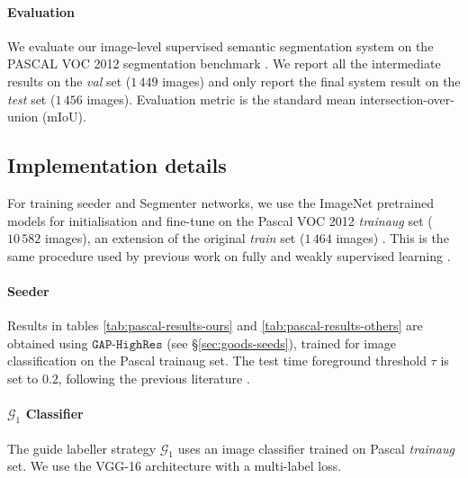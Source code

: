 \documentclass[british,10pt,twocolumn,letterpaper]{article}
\begin{document}
\paragraph{\label{subsec:Experimental-setup}Evaluation}

We evaluate our image-level supervised semantic segmentation system
on the PASCAL VOC 2012 segmentation benchmark \cite{pascal-voc-2012}.
We report all the intermediate results on the \textit{val}\emph{ }set
($1\,449$ images) and only report the final system result on the
\textit{test} set ($1\,456$ images). Evaluation metric is the standard mean
intersection-over-union (mIoU).


\subsection{\label{subsec:Implementation-details}Implementation details}

\noindent
For training seeder and Segmenter networks, we use the
ImageNet \cite{imagenet_cvpr09} pretrained models for initialisation
and fine-tune on the Pascal VOC 2012 \emph{trainaug} set ($10\,582$
images), an extension of the original \textit{train} set ($1\,464$ images)
\cite{pascal-voc-2012,Hariharan2011Iccv}. This is the same procedure
used by previous work on fully \cite{Chen2016ArxivDeeplabv2} and
weakly supervised learning \cite{kolesnikov2016seed}.

\paragraph{Seeder}

Results in tables \ref{tab:pascal-results-ours} and \ref{tab:pascal-results-others}
are obtained using $\mathtt{GAP}\text{-}\mathtt{HighRes}$ (see \S\ref{sec:goods-seeds}),
trained for image classification on the Pascal trainaug set. The test
time foreground threshold $\tau$ is set to $0.2$, following the
previous literature \cite{zhou2015cnnlocalization,kolesnikov2016seed}.

\paragraph{$\mathcal{G}_{1}$ \label{par:G1-Classifier-details}Classifier}

The guide labeller strategy $\mathcal{G}_{1}$ uses an image classifier
trained on Pascal \textit{trainaug} set. We use the VGG-16 architecture \cite{Simonyan2015Iclr}
with a multi-label loss. 
\end{document}
